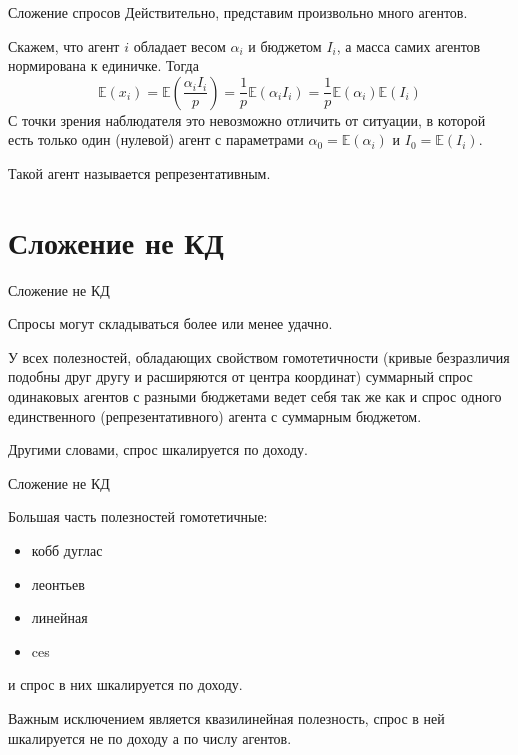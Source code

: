 \documentclass{beamer}
\begin{document}
\begin{frame}{Сложение спросов}
Действительно, представим произвольно много агентов. 

Скажем, что агент $i$ обладает весом $\alpha_i$ и бюджетом $I_i$, а масса самих агентов нормирована к единичке. Тогда
$$ \mathbb{E}(x_i) = \mathbb{E} (\frac{\alpha_i I_i}{p}) = \frac{1}{p} \mathbb{E}(\alpha_i I_i) = \frac{1}{p} \mathbb{E}(\alpha_i) \mathbb{E}(I_i)$$
С точки зрения наблюдателя это невозможно отличить от ситуации, в которой есть только один (нулевой) агент с параметрами $\alpha_0 =\mathbb{E}(\alpha_i)$ и $I_0 =\mathbb{E}(I_i)$.

Такой агент называется \alert{репрезентативным}.

\end{frame}

\section{Сложение не КД}

\begin{frame}{Сложение не КД}

Спросы могут складываться более или менее удачно. 

У всех полезностей, обладающих свойством \alert{гомотетичности} (кривые безразличия подобны друг другу и расширяются от центра координат) суммарный спрос одинаковых агентов с разными бюджетами ведет себя так же как и спрос одного единственного (репрезентативного) агента с суммарным бюджетом. 

Другими словами, спрос \alert{шкалируется по доходу}.

\end{frame}

\begin{frame}{Сложение не КД}

Большая часть полезностей гомотетичные:
\begin{itemize}
  \item кобб дуглас
  \item леонтьев
  \item линейная
  \item ces
\end{itemize}
и спрос в них шкалируется по доходу.

Важным исключением является квазилинейная полезность, спрос в ней шкалируется не по доходу а по числу агентов.

\end{frame}
\end{document}
